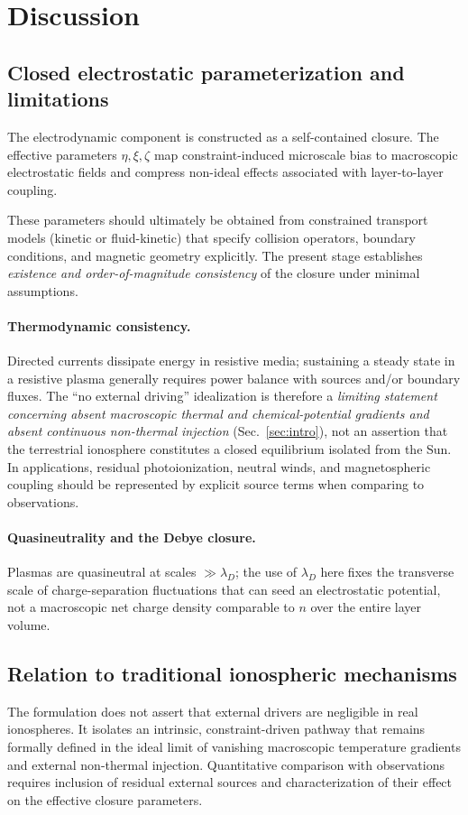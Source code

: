 \documentclass[11pt,a4paper]{article}
\begin{document}
\section{Discussion}
\subsection{Closed electrostatic parameterization and limitations}
The electrodynamic component is constructed as a self-contained closure. The effective parameters $\eta,\xi,\zeta$ map constraint-induced microscale bias to macroscopic electrostatic fields and compress non-ideal effects associated with layer-to-layer coupling.

These parameters should ultimately be obtained from constrained transport models (kinetic or fluid-kinetic) that specify collision operators, boundary conditions, and magnetic geometry explicitly. The present stage establishes \emph{existence and order-of-magnitude consistency} of the closure under minimal assumptions.

\paragraph{Thermodynamic consistency.}
Directed currents dissipate energy in resistive media; sustaining a steady state in a resistive plasma generally requires power balance with sources and/or boundary fluxes. The ``no external driving'' idealization is therefore a \emph{limiting statement concerning absent macroscopic thermal and chemical-potential gradients and absent continuous non-thermal injection} (Sec.~\ref{sec:intro}), not an assertion that the terrestrial ionosphere constitutes a closed equilibrium isolated from the Sun. In applications, residual photoionization, neutral winds, and magnetospheric coupling should be represented by explicit source terms when comparing to observations.

\paragraph{Quasineutrality and the Debye closure.}
Plasmas are quasineutral at scales $\gg \lambda_D$; the use of $\lambda_D$ here fixes the transverse scale of charge-separation fluctuations that can seed an electrostatic potential, not a macroscopic net charge density comparable to $n$ over the entire layer volume.

\subsection{Relation to traditional ionospheric mechanisms}
The formulation does not assert that external drivers are negligible in real ionospheres. It isolates an intrinsic, constraint-driven pathway that remains formally defined in the ideal limit of vanishing macroscopic temperature gradients and external non-thermal injection. Quantitative comparison with observations requires inclusion of residual external sources and characterization of their effect on the effective closure parameters.
\end{document}

